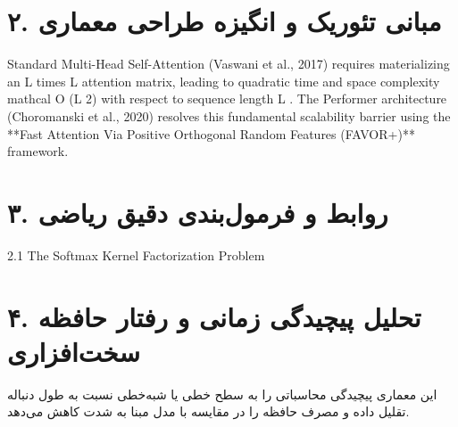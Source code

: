 \documentclass[12pt,a4paper]{article}
\begin{document}
\section*{۲. مبانی تئوریک و انگیزه طراحی معماری}
Standard Multi-Head Self-Attention (Vaswani et al., 2017) requires materializing an L times L attention matrix, leading to quadratic time and space complexity mathcal O (L 2) with respect to sequence length L . The Performer architecture (Choromanski et al., 2020) resolves this fundamental scalability barrier using the **Fast Attention Via Positive Orthogonal Random Features (FAVOR+)** framework.

\section*{۳. روابط و فرمول‌بندی دقیق ریاضی}
2.1 The Softmax Kernel Factorization Problem

\section*{۴. تحلیل پیچیدگی زمانی و رفتار حافظه سخت‌افزاری}
این معماری پیچیدگی محاسباتی را به سطح خطی یا شبه‌خطی نسبت به طول دنباله تقلیل داده و مصرف حافظه را در مقایسه با مدل مبنا به شدت کاهش می‌دهد.
\end{document}

